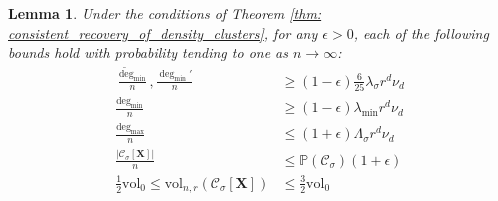 \documentclass{article}
\newcommand{\vol}{\mathrm{vol}}
\newcommand{\abs}[1]{\left \lvert #1 \right \rvert}
\newcommand{\1}{\mathbf{1}}
\newcommand{\degminpr}{\deg_{\min}'}
\newcommand{\degminwt}{\widetilde{\deg}_{\min}}
\newcommand{\degmax}{\deg_{\max}}
\newcommand{\degmin}{\deg_{\min}}
\newcommand{\Xbf}{\mathbf{X}}
\newcommand{\Pbb}{\mathbb{P}}
\newcommand{\Cset}{\mathcal{C}}
\newcommand{\Csig}{\Cset_{\sigma}}
\theoremstyle{aldenthm}
\newtheorem{lemma}{Lemma}
\begin{document}
\begin{lemma}
	\label{lem: ball_bounds_in_probability}
	Under the conditions of Theorem \ref{thm: consistent_recovery_of_density_clusters}, for any $\epsilon > 0$, each of the following bounds hold with probability tending to one as $n \to \infty$:
	\begin{align}
	\frac{\degminwt}{n}, \frac{\degminpr}{n} & \geq (1 - \epsilon)\frac{6}{25} \lambda_{\sigma} r^d \nu_d \label{eqn: min_cluster_degree_bound} \\
	\frac{\degmin}{n} & \geq  (1 - \epsilon) \lambda_{\min} r^d \nu_d \label{eqn: min_degree_bound} \\
	\frac{\degmax}{n} & \leq (1 + \epsilon) \Lambda_{\sigma} r^d \nu_d \label{eqn: max_degree_bound}\\
	\frac{\abs{\Csig[\Xbf]}}{n} & \leq \Pbb(\Csig)(1 + \epsilon) \label{eqn: Csig_cardinality_bound}\\
	\label{eqn: volwt_bound}
	\frac{1}{2}\vol_0 \leq \vol_{n,r}(\Csig[\Xbf]) & \leq \frac{3}{2} \vol_0
	\end{align}
\end{lemma}
\end{document}
